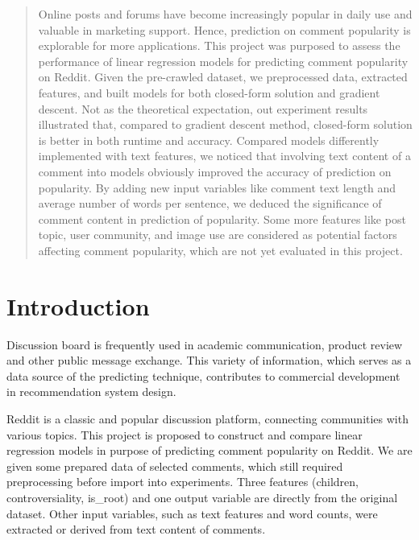 \documentclass[letterpaper, 12pt]{article}
\begin{document}

\clearpage
\setcounter{page}{2}

\singlespacing

\begin{abstract}
Online posts and forums have become increasingly popular in daily use and valuable in marketing support. Hence, prediction on comment popularity is explorable for more applications. This project was purposed to assess the performance of linear regression models for predicting comment popularity on Reddit. Given the pre-crawled dataset, we preprocessed data, extracted features, and built models for both closed-form solution and gradient descent. Not as the theoretical expectation, out experiment results illustrated that, compared to gradient descent method, closed-form solution is better in both runtime and accuracy. Compared models differently implemented with text features, we noticed that involving text content of a comment into models obviously improved the accuracy of prediction on popularity. By adding new input variables like comment text length and average number of words per sentence, we deduced the significance of comment content in prediction of popularity. Some more features like post topic, user community, and image use are considered as potential factors affecting comment popularity, which are not yet evaluated in this project.
\end{abstract}

\section*{Introduction}
Discussion board is frequently used in academic communication, product review and other public message exchange. This variety of information, which serves as a data source of the predicting technique, contributes to commercial development in recommendation system design\cite{rohlin2016popularity}.

Reddit is a classic and popular discussion platform, connecting communities with various topics. This project is proposed to construct and compare linear regression models in purpose of predicting comment popularity on Reddit. We are given some prepared data of selected comments, which still required preprocessing before import into experiments. Three features (children, controversiality, is\_root) and one output variable are directly from the original dataset. Other input variables, such as text features and word counts, were extracted or derived from text content of comments.
\end{document}
